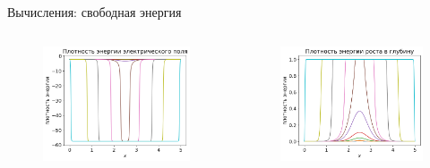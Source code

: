 \begin{frame}{Вычисления: свободная энергия}
\vspace{-0.8cm}
\begin{columns}
\begin{figure}
	\includegraphics[width=\textwidth]{figures/density_electrical.png}
\end{figure}
\begin{figure}
	\includegraphics[width=\textwidth]{figures/density_depth.png}
\end{figure}
\end{columns}
\end{frame}


